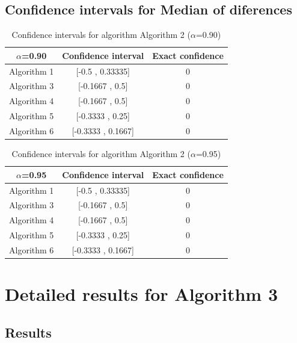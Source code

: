 \documentclass[a4paper,10pt]{article}
\begin{document}
\subsection{Confidence intervals for Median of diferences}

\begin{table}[!htp]
\centering\small
\begin{tabular}{
|c|c|c|}
\hline
 $\alpha$=0.90 & Confidence interval & Exact confidence \\ \hline 
Algorithm 1 & [-0.5 , 0.33335] & 0\\ \hline 
Algorithm 3 & [-0.1667 , 0.5] & 0\\ \hline 
Algorithm 4 & [-0.1667 , 0.5] & 0\\ \hline 
Algorithm 5 & [-0.3333 , 0.25] & 0\\ \hline 
Algorithm 6 & [-0.3333 , 0.1667] & 0\\ \hline 

\end{tabular}
\caption{Confidence intervals for algorithm Algorithm 2 ($\alpha$=0.90)}
\end{table}
\begin{table}[!htp]
\centering\small
\begin{tabular}{
|c|c|c|}
\hline
 $\alpha$=0.95 & Confidence interval & Exact confidence \\ \hline 
Algorithm 1 & [-0.5 , 0.33335] & 0\\ \hline 
Algorithm 3 & [-0.1667 , 0.5] & 0\\ \hline 
Algorithm 4 & [-0.1667 , 0.5] & 0\\ \hline 
Algorithm 5 & [-0.3333 , 0.25] & 0\\ \hline 
Algorithm 6 & [-0.3333 , 0.1667] & 0\\ \hline 

\end{tabular}
\caption{Confidence intervals for algorithm Algorithm 2 ($\alpha$=0.95)}
\end{table}

 \clearpage 


\section{Detailed results for Algorithm 3}


\subsection{Results}
\end{document}
